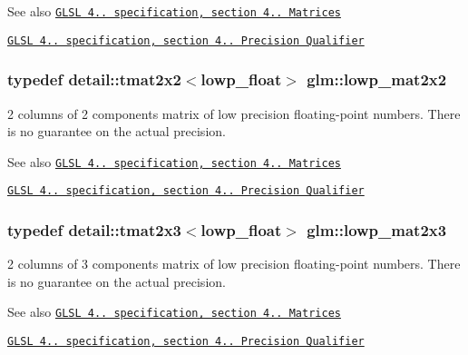 \begin{DoxySeeAlso}{See also}
\href{http://www.opengl.org/registry/doc/GLSLangSpec.4.20.8.pdf}{\tt G\+L\+S\+L 4.. specification, section 4.. Matrices} 

\href{http://www.opengl.org/registry/doc/GLSLangSpec.4.20.8.pdf}{\tt G\+L\+S\+L 4.. specification, section 4.. Precision Qualifier} 
\end{DoxySeeAlso}
\hypertarget{group__core__precision_gae3f6c672d0fa47ece879f2b1cda7f22b}{}
\subsubsection[{lowp\+\_\+mat2x2}]{\setlength{\rightskip}{0pt plus 5cm}typedef detail\+::tmat2x2$<$lowp\+\_\+float$>$ {\bf glm\+::lowp\+\_\+mat2x2}}\label{group__core__precision_gae3f6c672d0fa47ece879f2b1cda7f22b}
2 columns of 2 components matrix of low precision floating-\/point numbers. There is no guarantee on the actual precision.

\begin{DoxySeeAlso}{See also}
\href{http://www.opengl.org/registry/doc/GLSLangSpec.4.20.8.pdf}{\tt G\+L\+S\+L 4.. specification, section 4.. Matrices} 

\href{http://www.opengl.org/registry/doc/GLSLangSpec.4.20.8.pdf}{\tt G\+L\+S\+L 4.. specification, section 4.. Precision Qualifier} 
\end{DoxySeeAlso}
\hypertarget{group__core__precision_ga094f5266f214da7ef32e49df6432f4fa}{}
\subsubsection[{lowp\+\_\+mat2x3}]{\setlength{\rightskip}{0pt plus 5cm}typedef detail\+::tmat2x3$<$lowp\+\_\+float$>$ {\bf glm\+::lowp\+\_\+mat2x3}}\label{group__core__precision_ga094f5266f214da7ef32e49df6432f4fa}
2 columns of 3 components matrix of low precision floating-\/point numbers. There is no guarantee on the actual precision.

\begin{DoxySeeAlso}{See also}
\href{http://www.opengl.org/registry/doc/GLSLangSpec.4.20.8.pdf}{\tt G\+L\+S\+L 4.. specification, section 4.. Matrices} 

\href{http://www.opengl.org/registry/doc/GLSLangSpec.4.20.8.pdf}{\tt G\+L\+S\+L 4.. specification, section 4.. Precision Qualifier} 
\end{DoxySeeAlso}
\hypertarget{group__core__precision_ga800238e68eee3279c7a38d4f3cd005e8}{}
